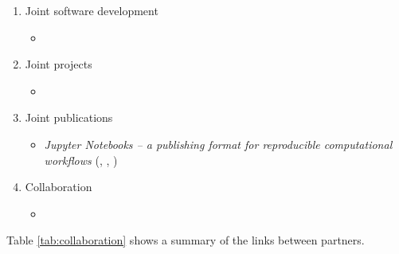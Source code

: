 \begin{enumerate}
\item Joint software development
  \begin{itemize}
  \item
  \end{itemize}

\item Joint projects
  \begin{itemize}
  \item
  \end{itemize}

\item Joint publications
  \begin{itemize}
  \item \emph{Jupyter Notebooks -- a publishing format for
      reproducible computational workflows} \cite{Kluyver2016} (, , )
  \end{itemize}

\item Collaboration
  \begin{itemize}
    \item
 \end{itemize}
\end{enumerate}

Table \ref{tab:collaboration} shows a summary of the links
between partners.


